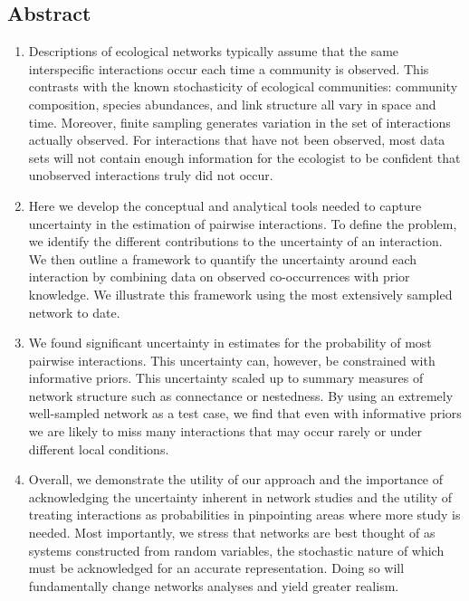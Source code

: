 \documentclass[12pt]{article}
\begin{document}
\begin{spacing}{2.0}

\section*{Abstract}

  \begin{enumerate}

    \item  Descriptions of ecological networks typically assume that the same interspecific interactions occur each time a community is observed. This contrasts with the known stochasticity of ecological communities: community composition, species abundances, and link structure all vary in space and time. Moreover, finite sampling generates variation in the set of interactions actually observed. For interactions that have not been observed, most data sets will not contain enough information for the ecologist to be confident that unobserved interactions truly did not occur.
    \item Here we develop the conceptual and analytical tools needed to capture uncertainty in the estimation of pairwise interactions. To define the problem, we identify the different contributions to the uncertainty of an interaction. We then outline a framework to quantify the uncertainty around each interaction by combining data on observed co-occurrences with prior knowledge. We illustrate this framework using the most extensively sampled network to date. 
    \item We found significant uncertainty in estimates for the probability of most pairwise interactions. This uncertainty can, however, be constrained with informative priors. This uncertainty scaled up to summary measures of network structure such as connectance or nestedness. By using an extremely well-sampled network as a test case, we find that even with informative priors we are likely to miss many interactions that may occur rarely or under different local conditions. 
    \item Overall, we demonstrate the utility of our approach and the importance of acknowledging the uncertainty inherent in network studies and the utility of treating interactions as probabilities in pinpointing areas where more study is needed. Most importantly, we stress that networks are best thought of as systems constructed from random variables, the stochastic nature of which must be acknowledged for an accurate representation. Doing so will fundamentally change networks analyses and yield greater realism.
\end{enumerate}



\end{spacing}
\end{document}
